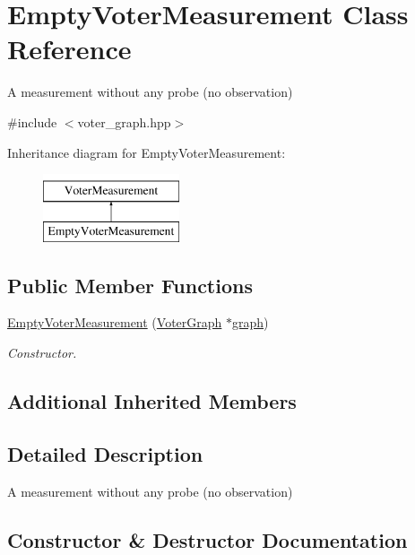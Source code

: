 \hypertarget{class_empty_voter_measurement}{}\section{Empty\+Voter\+Measurement Class Reference}
\label{class_empty_voter_measurement}


A measurement without any probe (no observation)  




{\ttfamily \#include $<$voter\+\_\+graph.\+hpp$>$}

Inheritance diagram for Empty\+Voter\+Measurement\+:\begin{figure}[H]
\begin{center}
\leavevmode
\includegraphics[height=2.000000cm]{class_empty_voter_measurement}
\end{center}
\end{figure}
\subsection*{Public Member Functions}
\begin{DoxyCompactItemize}
\item 
\hyperlink{class_empty_voter_measurement_aff7c264f9f2e68e3608e30b359468ed0}{Empty\+Voter\+Measurement} (\hyperlink{class_voter_graph}{Voter\+Graph} $\ast$\hyperlink{class_voter_measurement_a8d22d4b78f7e2f4c747f5716c4885351}{graph})
\begin{DoxyCompactList}\small\item\em Constructor. \end{DoxyCompactList}\end{DoxyCompactItemize}
\subsection*{Additional Inherited Members}


\subsection{Detailed Description}
A measurement without any probe (no observation) 

\subsection{Constructor \& Destructor Documentation}
\hypertarget{class_empty_voter_measurement_aff7c264f9f2e68e3608e30b359468ed0}{}
